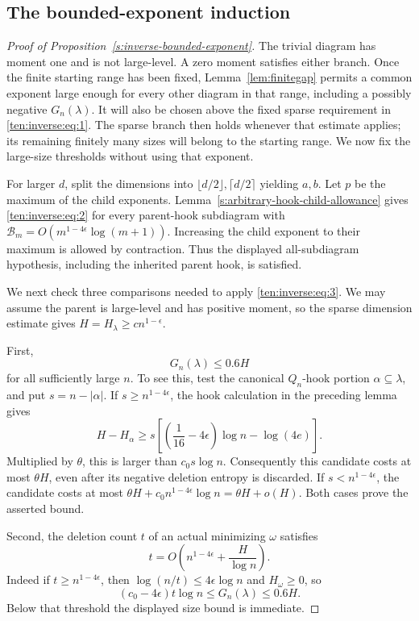 \subsection{The bounded-exponent induction}


\begin{proof}[Proof of Proposition~\ref{s:inverse-bounded-exponent}]
The trivial diagram has moment one and is not large-level. A zero moment
satisfies either branch. Once the finite starting range has been fixed,
Lemma~\ref{lem:finitegap} permits a common exponent large enough for
every other diagram in that range, including a possibly negative
$G_n(\lambda)$. It will also be chosen above the fixed sparse
requirement in \eqref{ten:inverse:eq:1}. The sparse branch then holds
whenever that estimate applies; its remaining finitely many sizes will
belong to the starting range. We now fix the large-size thresholds
without using that exponent.

For larger \(d\), split the dimensions into \(\lfloor d/2\rfloor,\lceil d/2\rceil\) yielding \(a,b\). Let \(p\) be the maximum of the child exponents. Lemma~\ref{s:arbitrary-hook-child-allowance} gives
\eqref{ten:inverse:eq:2} for every parent-hook subdiagram with
$\mathcal B_m=O(m^{1-4\epsilon}\log(m+1))$. Increasing the child exponent to
their maximum is allowed by contraction. Thus the displayed all-subdiagram
hypothesis, including the inherited parent hook, is satisfied.

We next check three comparisons needed to apply
\eqref{ten:inverse:eq:3}. We may assume the parent is large-level
and has positive moment, so the sparse dimension estimate gives
$H=H_\lambda\ge c n^{1-\epsilon}$.

First,
\[
 G_n(\lambda)\le0.6H
\]
for all sufficiently large $n$. To see this, test the canonical
$Q_n$-hook portion $\alpha\subseteq\lambda$, and put $s=n-|\alpha|$.
If $s\ge n^{1-4\epsilon}$, the hook calculation in the preceding
lemma gives
\[
 H-H_\alpha\ge
 s\left[\left(\frac1{16}-4\epsilon\right)\log n-\log(4e)\right].
\]
Multiplied by $\theta$, this is larger than $c_0s\log n$.
Consequently this candidate costs at most $\theta H$, even after
its negative deletion entropy is discarded. If $s<n^{1-4\epsilon}$,
the candidate costs at most
$\theta H+c_0n^{1-4\epsilon}\log n=\theta H+o(H)$.
Both cases prove the asserted bound.

Second, the deletion count $t$ of an actual minimizing $\omega$
satisfies
\[
 t=O\left(n^{1-4\epsilon}+\frac H{\log n}\right).
\]
Indeed if $t\ge n^{1-4\epsilon}$, then
$\log(n/t)\le4\epsilon\log n$ and $H_\omega\ge0$, so
\[
 (c_0-4\epsilon)t\log n\le G_n(\lambda)\le0.6H.
\]
Below that threshold the displayed size bound is immediate.


\end{proof}
